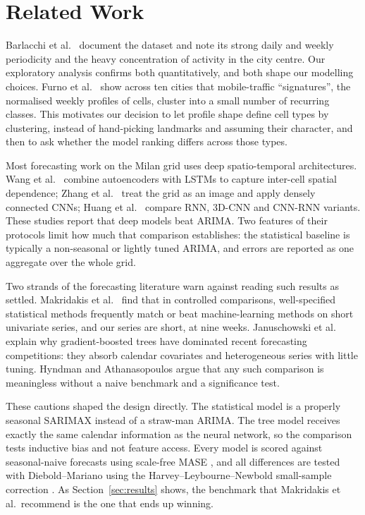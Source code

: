 \documentclass[conference,onecolumn,11pt]{IEEEtran}
\begin{document}
\section{Related Work}
Barlacchi et al.\ \cite{barlacchi2015} document the dataset and note its strong daily and weekly periodicity and the heavy concentration of activity in the city centre. Our exploratory analysis confirms both quantitatively, and both shape our modelling choices. Furno et al.\ \cite{furno2017} show across ten cities that mobile-traffic ``signatures'', the normalised weekly profiles of cells, cluster into a small number of recurring classes. This motivates our decision to let profile shape define cell types by clustering, instead of hand-picking landmarks and assuming their character, and then to ask whether the model ranking differs across those types.

Most forecasting work on the Milan grid uses deep spatio-temporal architectures. Wang et al.\ \cite{wang2017} combine autoencoders with LSTMs to capture inter-cell spatial dependence; Zhang et al.\ \cite{zhang2018} treat the grid as an image and apply densely connected CNNs; Huang et al.\ \cite{huang2017} compare RNN, 3D-CNN and CNN-RNN variants. These studies report that deep models beat ARIMA. Two features of their protocols limit how much that comparison establishes: the statistical baseline is typically a non-seasonal or lightly tuned ARIMA, and errors are reported as one aggregate over the whole grid.

Two strands of the forecasting literature warn against reading such results as settled. Makridakis et al.\ \cite{makridakis2018} find that in controlled comparisons, well-specified statistical methods frequently match or beat machine-learning methods on short univariate series, and our series are short, at nine weeks. Januschowski et al.\ \cite{januschowski2022} explain why gradient-boosted trees have dominated recent forecasting competitions: they absorb calendar covariates and heterogeneous series with little tuning. Hyndman and Athanasopoulos \cite{hyndman2021} argue that any such comparison is meaningless without a naive benchmark and a significance test.

These cautions shaped the design directly. The statistical model is a properly seasonal SARIMAX instead of a straw-man ARIMA. The tree model receives exactly the same calendar information as the neural network, so the comparison tests inductive bias and not feature access. Every model is scored against seasonal-naive forecasts using scale-free MASE \cite{hyndman2006}, and all differences are tested with Diebold--Mariano \cite{diebold1995} using the Harvey--Leybourne--Newbold small-sample correction \cite{harvey1997}. As Section~\ref{sec:results} shows, the benchmark that Makridakis et al.\ recommend is the one that ends up winning.
\end{document}
